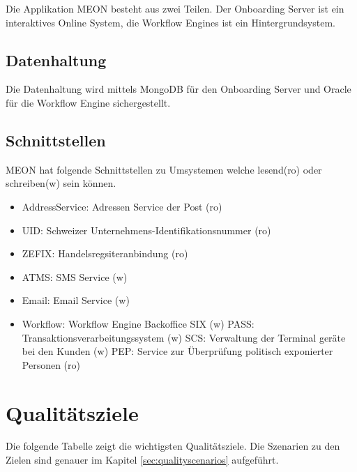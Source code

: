 Die Applikation MEON besteht aus zwei Teilen. Der Onboarding Server ist ein interaktives Online System, die Workflow Engines ist ein Hintergrundsystem.

\subsection{Datenhaltung}

Die Datenhaltung wird mittels MongoDB für den Onboarding Server und Oracle für die Workflow Engine sichergestellt.

\subsection{Schnittstellen}

MEON hat folgende Schnittstellen zu Umsystemen welche lesend(ro) oder schreiben(w) sein können.
\begin{itemize}
	\item AddressService: Adressen Service der Post (ro)
	\item UID: Schweizer Unternehmens-Identifikationsnummer (ro) 
	\item ZEFIX: Handelsregsiteranbindung (ro)
	\item ATMS: SMS Service (w)
	\item Email: Email Service (w)
	\item Workflow: Workflow Engine Backoffice SIX (w)
	\subitem PASS: Transaktionsverarbeitungssystem (w)
	\subitem SCS: Verwaltung der Terminal geräte bei den Kunden (w)
	\subitem PEP: Service zur Überprüfung politisch exponierter Personen (ro)
\end{itemize}

\section{Qualitätsziele}

Die folgende Tabelle zeigt die wichtigsten Qualitätsziele. Die Szenarien zu den Zielen sind genauer im Kapitel \ref{sec:qualityscenarios} aufgeführt.

